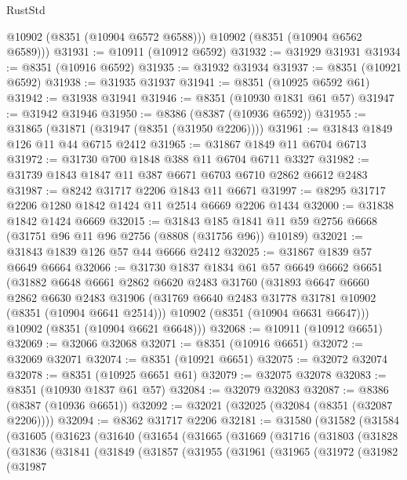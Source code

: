 \begin{lexlean}{RustStd}
\begin{coremodule}
        @10902
        (@8351 (@10904 @6572 @6588)))
      @10902
      (@8351 (@10904 @6562 @6589)))
@31931 := @10911 (@10912 @6592)
@31932 := @31929 @31931
@31934 := @8351 (@10916 @6592)
@31935 := @31932 @31934
@31937 := @8351 (@10921 @6592)
@31938 := @31935 @31937
@31941 := @8351 (@10925 @6592 @61)
@31942 := @31938 @31941
@31946 := @8351 (@10930 @1831 @61 @57)
@31947 := @31942 @31946
@31950 := @8386 (@8387 (@10936 @6592))
@31955 := @31865 (@31871 (@31947 (@8351 (@31950 @2206))))
@31961 := @31843 @1849 @126 @11 @44 @6715 @2412
@31965 := @31867 @1849 @11 @6704 @6713
@31972 := @31730 @700 @1848 @388 @11 @6704 @6711 @3327
@31982 := @31739 @1843 @1847 @11 @387 @6671 @6703 @6710 @2862 @6612 @2483
@31987 := @8242 @31717 @2206 @1843 @11 @6671
@31997 := @8295 @31717 @2206 @1280 @1842 @1424 @11 @2514 @6669 @2206 @1434
@32000 := @31838 @1842 @1424 @6669
@32015 := @31843
    @185
    @1841
    @11
    @59
    @2756
    @6668
    (@31751 @96 @11 @96 @2756 (@8808 (@31756 @96)) @10189)
@32021 := @31843 @1839 @126 @57 @44 @6666 @2412
@32025 := @31867 @1839 @57 @6649 @6664
@32066 := @31730
    @1837
    @1834
    @61
    @57
    @6649
    @6662
    @6651
    (@31882
      @6648
      @6661
      @2862
      @6620
      @2483
      @31760
      (@31893
        @6647
        @6660
        @2862
        @6630
        @2483
        @31906
        (@31769 @6640 @2483 @31778 @31781 @10902 (@8351 (@10904 @6641 @2514)))
        @10902
        (@8351 (@10904 @6631 @6647)))
      @10902
      (@8351 (@10904 @6621 @6648)))
@32068 := @10911 (@10912 @6651)
@32069 := @32066 @32068
@32071 := @8351 (@10916 @6651)
@32072 := @32069 @32071
@32074 := @8351 (@10921 @6651)
@32075 := @32072 @32074
@32078 := @8351 (@10925 @6651 @61)
@32079 := @32075 @32078
@32083 := @8351 (@10930 @1837 @61 @57)
@32084 := @32079 @32083
@32087 := @8386 (@8387 (@10936 @6651))
@32092 := @32021 (@32025 (@32084 (@8351 (@32087 @2206))))
@32094 := @8362 @31717 @2206
@32181 := @31580
    (@31582
      (@31584
        (@31605
          (@31623
            (@31640
              (@31654
                (@31665
                  (@31669
                    (@31716
                      (@31803
                        (@31828
                          (@31836
                            (@31841
                              (@31849
                                (@31857
                                  (@31955
                                    (@31961
                                      (@31965
                                        (@31972
                                          (@31982
                                            (@31987

\end{coremodule}
\end{lexlean}
